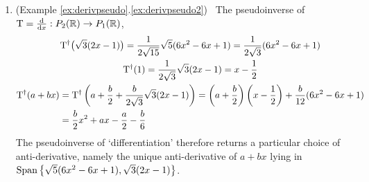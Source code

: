 \begin{examples}{}{}
\begin{enumerate}
		\item (Example \ref*{ex:derivpseudo}.\ref{ex:derivpseudo2}) \ The pseudoinverse of $\mathrm{T}=\frac{\mathrm{d} }{\mathrm{d} x}:P_2(\mathbb{R})\to P_1(\mathbb{R})$,
		\begin{gather*}
			\mathrm{T}^\dag\big(\sqrt 3(2x-1)\big)=\frac 1{2\sqrt{15}}\sqrt 5(6x^2-6x+1) =\frac 1{2\sqrt 3}(6x^2-6x+1)\\
			\mathrm{T}^\dag(1)=\frac 1{2\sqrt 3}\sqrt 3(2x-1)=x-\frac 12\\
			\begin{aligned}
				\mathrm{T}^\dag(a+bx)
				&=\mathrm{T}^\dag\left(a+\frac b2+\frac b{2\sqrt 3}\sqrt 3(2x-1)\right)
				=\left(a+\frac b2\right)\left(x-\frac 12\right)+\frac b{12}(6x^2-6x+1)\\
				&=\frac b2x^2+ax-\frac a2-\frac b6
			\end{aligned}
		\end{gather*}
		The pseudoinverse of `differentiation' therefore returns a particular choice of anti-derivative, namely the unique anti-derivative of $a+bx$ lying in $\operatorname{Span}\big\{\sqrt 5(6x^2-6x+1),\sqrt 3(2x-1)\big\}$.
	\end{enumerate}
	
\end{examples}

